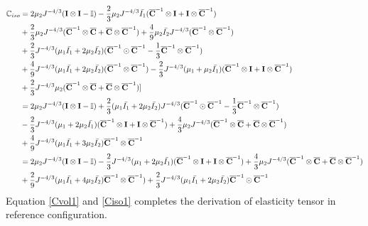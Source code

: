 \begin{equation} \label{Ciso1}
\begin{split}
\mathbb{C}_{iso} 
&= 
2\mu_2{J}^{-4/3}(\bold{I} \otimes \bold{I} - \mathbb{I}) - \frac{2}{3}\mu_2J^{-4/3}\bar{I_1}({\overline{\bold{C}}}^{-1} \otimes \bold{I} + \bold{I} \otimes {\overline{\bold{C}}}^{-1}) \\
&+
\frac{2}{3}\mu_2J^{-4/3}({\overline{\bold{C}}}^{-1} \otimes {\overline{\bold{C}}} + {\overline{\bold{C}}} \otimes {\overline{\bold{C}}}^{-1}) + \frac{4}{9}\mu_2\bar{I_2}J^{-4/3}({\overline{\bold{C}}}^{-1} \otimes {\overline{\bold{C}}}^{-1}) \\
&+
\frac{2}{3}J^{-4/3}(\mu_1\bar{I_1} + 2\mu_2\bar{I_2})({\overline{\bold{C}}}^{-1} \odot {{\overline{\bold{C}}}}^{-1} - \frac{1}{3}{{\overline{\bold{C}}}}^{-1} \otimes {\overline{{\bold{C}}}}^{-1}) \\
&+
\frac{4}{9}J^{-4/3} (\mu_1\bar{I_1} + 2\mu_2\bar{I_2})({\overline{\bold{C}}}^{-1} \otimes {\overline{\bold{C}}}^{-1}) - \frac{2}{3}J^{-4/3}(\mu_1+\mu_2\bar{I_1})({\overline{\bold{C}}}^{-1} \otimes \bold{I} + \bold{I} \otimes {\overline{\bold{C}}}^{-1})\\
&+ \frac{2}{3}J^{-4/3}\mu_2({\overline{\bold{C}}}^{-1} \otimes {\overline{\bold{C}}}+{\overline{\bold{C}}} \otimes {\overline{\bold{C}}}^{-1}) ] \\
&=
2\mu_2{J}^{-4/3}(\bold{I} \otimes \bold{I} - \mathbb{I}) + \frac{2}{3}(\mu_1\bar{I_1} + 2\mu_2\bar{I_2})J^{-4/3}({\overline{\bold{C}}}^{-1} \odot {\overline{\bold{C}}}^{-1} - \frac{1}{3}{\overline{\bold{C}}}^{-1} \otimes {\overline{\bold{C}}}^{-1}) \\
&-
\frac{2}{3}J^{-4/3}(\mu_1 + 2\mu_2\bar{I_1})({\overline{\bold{C}}}^{-1} \otimes \bold{I} + \bold{I} \otimes {\overline{\bold{C}}}^{-1}) + \frac{4}{3}\mu_2J^{-4/3}({\overline{\bold{C}}}^{-1} \otimes {\overline{\bold{C}}} + {\overline{\bold{C}}} \otimes {\overline{\bold{C}}}^{-1}) \\
&+
\frac{4}{9}J^{-4/3}(\mu_1\bar{I_1} + 3\mu_2\bar{I_2}){\overline{\bold{C}}}^{-1} \otimes {\overline{\bold{C}}}^{-1} \\
&=
2\mu_2{J}^{-4/3}(\bold{I} \otimes \bold{I} - \mathbb{I}) - \frac{2}{3}J^{-4/3}(\mu_1 + 2\mu_2\bar{I_1})({\overline{\bold{C}}}^{-1} \otimes \bold{I} + \bold{I} \otimes {\overline{\bold{C}}}^{-1}) + \frac{4}{3}\mu_2J^{-4/3}({\overline{\bold{C}}}^{-1} \otimes {\overline{\bold{C}}} + {\overline{\bold{C}}} \otimes {\overline{\bold{C}}}^{-1}) \\
&+
\frac{2}{9}J^{-4/3}(\mu_1\bar{I_1} + 4\mu_2\bar{I_2}) {\overline{\bold{C}}}^{-1} \otimes {\overline{\bold{C}}}^{-1}) + \frac{2}{3}J^{-4/3}(\mu_1\bar{I_1} + 2\mu_2\bar{I_2}){\overline{\bold{C}}}^{-1} \odot {\overline{\bold{C}}}^{-1} 
\end{split}
\end{equation} 
Equation \ref{Cvol1} and \ref{Ciso1} completes the derivation of elasticity tensor in reference configuration.





















